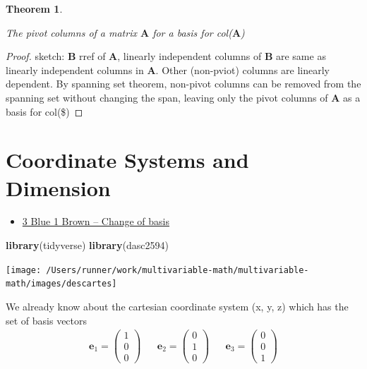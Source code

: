 \documentclass[
]{book}
\newenvironment{Shaded}{\begin{snugshade}}{\end{snugshade}}
\newcommand{\KeywordTok}[1]{\textcolor[rgb]{0.13,0.29,0.53}{\textbf{#1}}}
\newcommand{\NormalTok}[1]{#1}
\providecommand{\tightlist}{%
  \setlength{\itemsep}{0pt}\setlength{\parskip}{0pt}}
\newtheorem{theorem}{Theorem}[chapter]
\theoremstyle{definition}
\theoremstyle{definition}
\theoremstyle{definition}
\theoremstyle{remark}
\begin{document}
\begin{theorem}
\protect\hypertarget{thm:unlabeled-div-134}{}\label{thm:unlabeled-div-134}

The pivot columns of a matrix \(\mathbf{A}\) for a basis for col(\(\mathbf{A}\))

\end{theorem}

\begin{proof}

sketch: \(\mathbf{B}\) rref of \(\mathbf{A}\), linearly independent columns of \(\mathbf{B}\) are same as linearly independent columns in \(\mathbf{A}\). Other (non-pviot) columns are linearly dependent. By spanning set theorem, non-pivot columns can be removed from the spanning set without changing the span, leaving only the pivot columns of \(\mathbf{A}\) as a basis for col(\$)

\end{proof}

\hypertarget{coordinate-systems-and-dimension}{%
\chapter{Coordinate Systems and Dimension}\label{coordinate-systems-and-dimension}}

\begin{itemize}
\tightlist
\item
  \href{https://www.3blue1brown.com/lessons/change-of-basis}{3 Blue 1 Brown -- Change of basis}
\end{itemize}

\newcommand{\basis}{{\mathcal{B} = \{ \mathbf{b}_1, \ldots, \mathbf{b}_n \}}}
\newcommand{\V}{{\mathcal{V}}}

\begin{Shaded}
\begin{Highlighting}[]
\KeywordTok{library}\NormalTok{(tidyverse)}
\KeywordTok{library}\NormalTok{(dasc2594)}
\end{Highlighting}
\end{Shaded}

\texttt{[image: /Users/runner/work/multivariable-math/multivariable-math/images/descartes]}

We already know about the cartesian coordinate system (x, y, z) which has the set of basis vectors
\[
\begin{aligned}
\mathbf{e}_1 = \begin{pmatrix} 1 \\ 0 \\ 0 \end{pmatrix} && 
\mathbf{e}_2 = \begin{pmatrix} 0 \\ 1 \\ 0 \end{pmatrix} && 
\mathbf{e}_3 = \begin{pmatrix} 0 \\ 0 \\ 1 \end{pmatrix} 
\end{aligned}
\]
\end{document}
